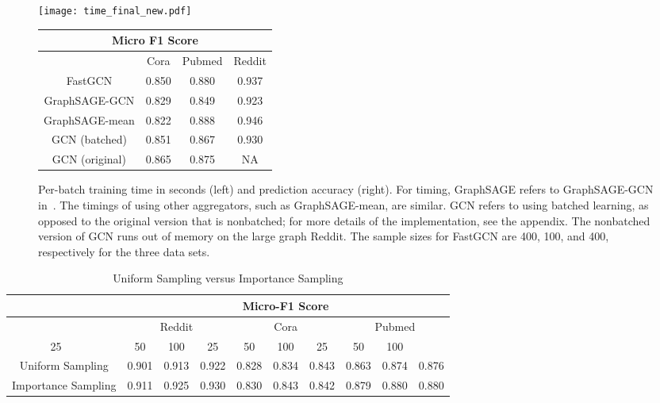\documentclass{article} \usepackage{iclr2018_conference,times}
\theoremstyle{plain}\newtheorem{theorem}{Theorem}\theoremstyle{plain}\newtheorem{proposition}[theorem]{Proposition}
\theoremstyle{plain}\newtheorem{corollary}[theorem]{Corollary}
\theoremstyle{plain}\newtheorem{lemma}[theorem]{Lemma}
\begin{document}
\begin{figure}[ht]
\begin{minipage}{0.45\linewidth}
\centering
\texttt{[image: time\_final\_new.pdf]}
\end{minipage}\begin{minipage}{0.55\linewidth}
\centering
\begin{tabular}{cccc}
\multicolumn{4}{c}{Micro F1 Score}\\
\hline
& Cora & Pubmed & Reddit\\
\hline
FastGCN          &0.850 &0.880 & 0.937\\
GraphSAGE-GCN    &0.829 &0.849 & 0.923\\
GraphSAGE-mean   &0.822 &0.888 & 0.946 \\
GCN (batched)    &0.851 &0.867 & 0.930\\
GCN (original)   &0.865 &0.875 & NA\\
\hline
\end{tabular}
\end{minipage}
\caption{Per-batch training time in seconds (left) and prediction accuracy (right). For timing, GraphSAGE refers to GraphSAGE-GCN in~\cite{DBLP:journals/corr/HamiltonYL17}. The timings of using other aggregators, such as GraphSAGE-mean, are similar. GCN refers to using batched learning, as opposed to the original version that is nonbatched; for more details of the implementation, see the appendix. The nonbatched version of GCN runs out of memory on the large graph Reddit. The sample sizes for FastGCN are 400, 100, and 400, respectively for the three data sets.}
\label{fig:time}
\end{figure}

\begin{table*}[ht]
\centering
  \caption{Uniform Sampling versus Importance Sampling}
  \label{tab:uni_inp}
  \begin{tabular}{llccccccccc}
  \hline
  &&\multicolumn{9}{c}{Micro-F1 Score}\\\hline
 \multirow{2}{*}{} &  & \multicolumn{3}{c}{Reddit}& \multicolumn{3}{c}{Cora}& \multicolumn{3}{c}{Pubmed} \\
    \multicolumn{2}{c}{\# Samples in Layer } & 25 & 50 & 100 & 25 & 50 & 100& 25 & 50 & 100\\\hline
\multicolumn{2}{c}{ Uniform Sampling} &   0.901&0.913  &0.922  & 0.828&0.834&0.843 &0.863&0.874&0.876\\
\multicolumn{2}{c}{Importance Sampling} & 0.911 &0.925  &0.930 &0.830 & 0.843&0.842& 0.879&0.880&0.880\\
\hline
  \end{tabular}
\end{table*}
\fi
\end{document}
